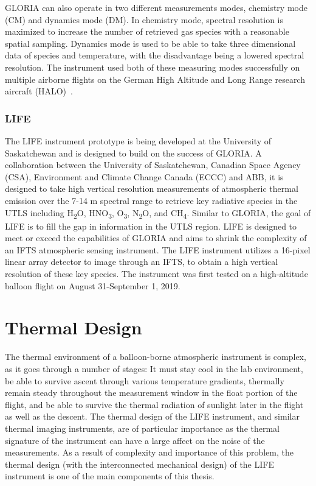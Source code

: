GLORIA can also operate in two different measurements modes, chemistry mode (CM) and dynamics mode (DM). In chemistry mode, spectral resolution is maximized to increase the number of retrieved gas species with a reasonable spatial sampling. Dynamics mode is used to be able to take three dimensional data of species and temperature, with the disadvantage being a lowered spectral resolution. The instrument used both of these measuring modes successfully on multiple airborne flights on the German High Altitude and Long Range research aircraft (HALO)~\citep{GLORIA_concept}. 

\subsubsection{LIFE} %
The LIFE instrument prototype is being developed at the University of Saskatchewan and is designed to build on the success of GLORIA.  A collaboration between the University of Saskatchewan, Canadian Space Agency (CSA), Environment and Climate Change Canada (ECCC) and ABB, it is designed to take high vertical resolution measurements of atmospheric thermal emission over the 7-14 \textmu m spectral range to retrieve key radiative species in the UTLS including H\textsubscript{2}O, HNO\textsubscript{3}, O\textsubscript{3}, N\textsubscript{2}O, and CH\textsubscript{4}. Similar to GLORIA, the goal of LIFE is to fill the gap in information in the UTLS region. LIFE is designed to meet or exceed the capabilities of GLORIA and aims to shrink the complexity of an IFTS atmospheric sensing instrument. The LIFE instrument utilizes a 16-pixel linear array detector to image through an IFTS, to obtain a high vertical resolution of these key species. The instrument was first tested on a high-altitude balloon flight on August 31-September 1, 2019.

\section{Thermal Design}
The thermal environment of a balloon-borne atmospheric instrument is complex, as it goes through a number of stages: It must stay cool in the lab environment, be able to survive ascent through various temperature gradients, thermally remain steady throughout the measurement window in the float portion of the flight, and be able to survive the thermal radiation of sunlight later in the flight as well as the descent. The thermal design of the LIFE instrument, and similar thermal imaging instruments, are of particular importance as the thermal signature of the instrument can have a large affect on the noise of the measurements. As a result of complexity and importance of this problem, the thermal design (with the interconnected mechanical design) of the LIFE instrument is one of the main components of this thesis. 

